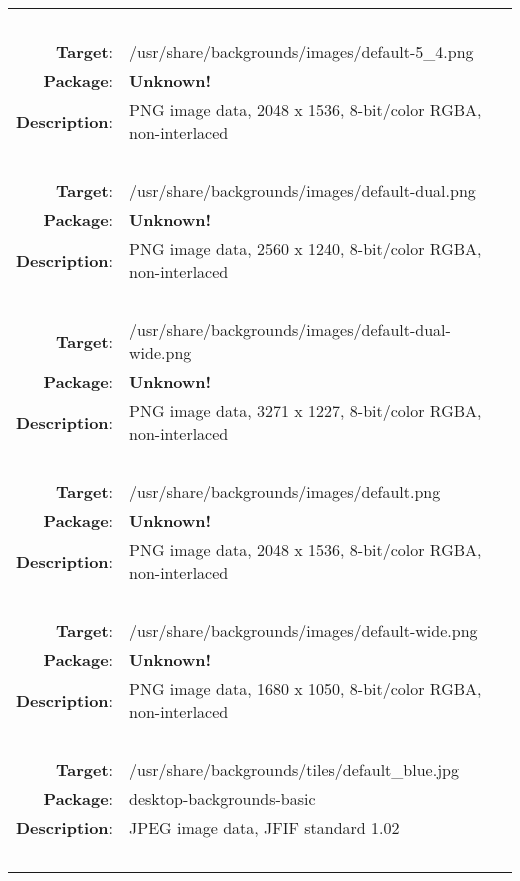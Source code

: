 \begin{longtable}{rl}
\hline
\multicolumn{2}{l}{\ }\\
\textbf{Target}: & /usr/share/backgrounds/images/default-5\_4.png\\
\textbf{Package}: & \textbf{Unknown!}\\
\textbf{Description}: & PNG image data, 2048 x 1536, 8-bit/color RGBA, non-interlaced\\
\multicolumn{2}{l}{\ }\\
\textbf{Target}: & /usr/share/backgrounds/images/default-dual.png\\
\textbf{Package}: & \textbf{Unknown!}\\
\textbf{Description}: & PNG image data, 2560 x 1240, 8-bit/color RGBA, non-interlaced\\
\multicolumn{2}{l}{\ }\\
\textbf{Target}: & /usr/share/backgrounds/images/default-dual-wide.png\\
\textbf{Package}: & \textbf{Unknown!}\\
\textbf{Description}: & PNG image data, 3271 x 1227, 8-bit/color RGBA, non-interlaced\\
\multicolumn{2}{l}{\ }\\
\textbf{Target}: & /usr/share/backgrounds/images/default.png\\
\textbf{Package}: & \textbf{Unknown!}\\
\textbf{Description}: & PNG image data, 2048 x 1536, 8-bit/color RGBA, non-interlaced\\
\multicolumn{2}{l}{\ }\\
\textbf{Target}: & /usr/share/backgrounds/images/default-wide.png\\
\textbf{Package}: & \textbf{Unknown!}\\
\textbf{Description}: & PNG image data, 1680 x 1050, 8-bit/color RGBA, non-interlaced\\
\multicolumn{2}{l}{\ }\\
\textbf{Target}: & /usr/share/backgrounds/tiles/default\_blue.jpg\\
\textbf{Package}: & desktop-backgrounds-basic\\
\textbf{Description}: & JPEG image data, JFIF standard 1.02\\
\multicolumn{2}{l}{\ }\\
\hline
\end{longtable}
